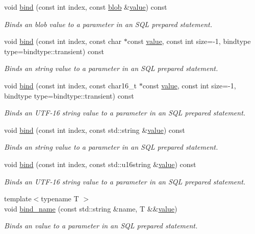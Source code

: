 \begin{DoxyCompactItemize}
void \hyperlink{a00013_aaaa1ec53616b974e0dce72f3ba88b20f}{bind} (const int index, const \hyperlink{a00002}{blob} \&\hyperlink{a00015}{value}) const 
\begin{DoxyCompactList}\small\item\em Binds an blob value to a parameter in an S\-Q\-L prepared statement. \end{DoxyCompactList}\item 
void \hyperlink{a00013_a778fde6911aba25ea0ca3c6d7a8be870}{bind} (const int index, const char $\ast$const \hyperlink{a00015}{value}, const int size=-\/1, bindtype type=bindtype\-::transient) const 
\begin{DoxyCompactList}\small\item\em Binds an string value to a parameter in an S\-Q\-L prepared statement. \end{DoxyCompactList}\item 
void \hyperlink{a00013_aa81eabe0c43e779bfaf82e465d76d8a7}{bind} (const int index, const char16\-\_\-t $\ast$const \hyperlink{a00015}{value}, const int size=-\/1, bindtype type=bindtype\-::transient) const 
\begin{DoxyCompactList}\small\item\em Binds an U\-T\-F-\/16 string value to a parameter in an S\-Q\-L prepared statement. \end{DoxyCompactList}\item 
void \hyperlink{a00013_a8aa321913ed5bf9398d0694f4a222c15}{bind} (const int index, const std\-::string \&\hyperlink{a00015}{value}) const 
\begin{DoxyCompactList}\small\item\em Binds an string value to a parameter in an S\-Q\-L prepared statement. \end{DoxyCompactList}\item 
void \hyperlink{a00013_a2812922c3fc691f556ed230768b5ca43}{bind} (const int index, const std\-::u16string \&\hyperlink{a00015}{value}) const 
\begin{DoxyCompactList}\small\item\em Binds an U\-T\-F-\/16 string value to a parameter in an S\-Q\-L prepared statement. \end{DoxyCompactList}\item 
{\footnotesize template$<$typename T $>$ }\\void \hyperlink{a00013_a8375bd6c666e395325227048ec0d6065}{bind\-\_\-name} (const std\-::string \&name, T \&\&\hyperlink{a00015}{value})
\begin{DoxyCompactList}\small\item\em Binds an value to a parameter in an S\-Q\-L prepared statement. \end{DoxyCompactList}\item 

\end{DoxyCompactItemize}
